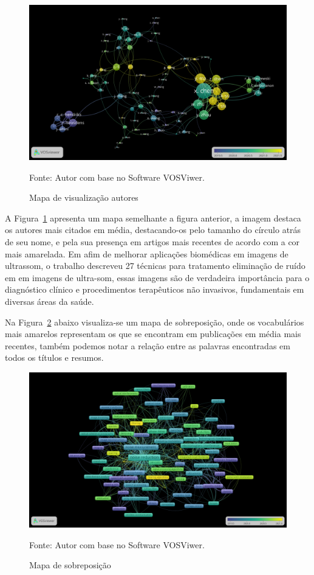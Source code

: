 \begin{figure}[H]
	\centering
	\includegraphics[width=15cm]{anexos/ris/IEEE/Noise_reduction_and_noise_abatement_andsensor_filtering_algorithm/overlay_visualization_cites.png}
	\caption{Mapa de visualização autores}
	Fonte: Autor com base no Software VOSViwer.
	\label{fig: overlay_visualization_cites}
\end{figure}

A Figura~\ref{fig: overlay_visualization_cites} apresenta um mapa semelhante a figura anterior, a imagem destaca os autores mais citados em média, destacando-os pelo tamanho do círculo atrás de seu nome, e pela sua presença em artigos mais recentes de acordo com a cor mais amarelada.
Em \cite{duarte_speckle_noise} afim de melhorar aplicações biomédicas em imagens de ultrassom, o trabalho descreveu 27 técnicas para tratamento eliminação de ruído em em imagens de ultra-som, essas imagens são de verdadeira importância para o diagnóstico clínico e procedimentos terapêuticos não invasivos, fundamentais em diversas áreas da saúde.

Na Figura~\ref{fig: overlay_visualization} abaixo visualiza-se um mapa de sobreposição, onde os vocabulários mais amarelos representam os que se encontram em publicações em média mais recentes, também podemos notar a relação entre as palavras encontradas em todos os títulos e resumos.

\begin{figure}[H]
	\centering
	\includegraphics[width=15cm]{anexos/ris/IEEE/Noise_reduction_and_noise_abatement_andsensor_filtering_algorithm/overlay_visualization.png}
	\caption{Mapa de sobreposição}
	Fonte: Autor com base no Software VOSViwer.
	\label{fig: overlay_visualization}
\end{figure}

